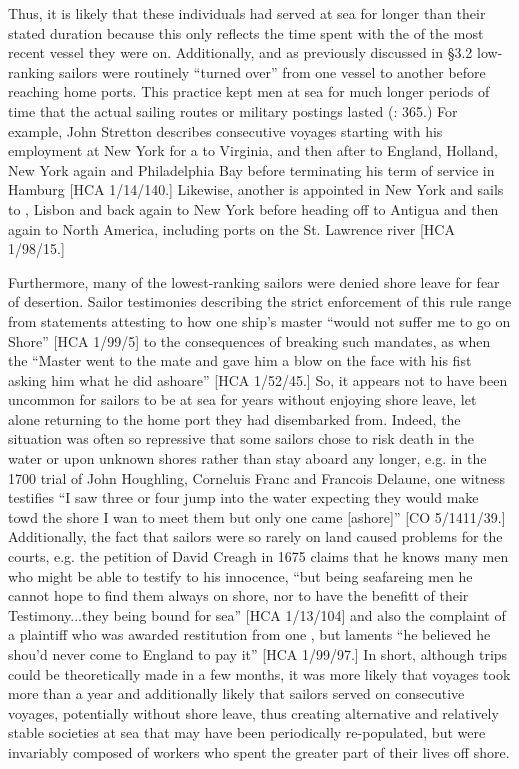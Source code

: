 Thus, it is likely that these individuals had served at sea for longer than their stated duration because this only reflects the time spent with the  of the most recent vessel they were on. Additionally, and as previously discussed in §3.2 low-ranking sailors were routinely “turned over” from one vessel to another before reaching home ports. This practice kept men at sea for much longer periods of time that the actual sailing routes or military postings lasted (\citealt{AdkinsAdkins2008}: 365.) For example, John Stretton describes consecutive voyages starting with his employment at New York for a  to Virginia, and then after to England, Holland, New York again and Philadelphia Bay before terminating his term of service in Hamburg [HCA 1/14/140.] Likewise, another  is appointed in New York and sails to , Lisbon and back again to New York before heading off to Antigua and then again to North America, including ports on the St. Lawrence river [HCA 1/98/15.] 

Furthermore, many of the lowest-ranking sailors were denied shore leave for fear of desertion. Sailor testimonies describing the strict enforcement of this rule range from statements attesting to how one ship’s master “would not suffer me to go on Shore” [HCA 1/99/5] to the consequences of breaking such mandates, as when the “Master went to the mate and gave him a blow on the face with his fist asking him what he did ashoare” [HCA 1/52/45.] So, it appears not to have been uncommon for sailors to be at sea for years without enjoying shore leave, let alone returning to the home port they had disembarked from. Indeed, the situation was often so repressive that some sailors chose to risk death in the water or upon unknown shores rather than stay aboard any longer, e.g. in the 1700 trial of John Houghling, Corneluis Franc and Francois Delaune, one witness testifies “I saw three or four jump into the water expecting they would make towd the shore I wan to meet them but only one came [ashore]” [CO 5/1411/39.] Additionally, the fact that sailors were so rarely on land caused problems for the courts, e.g. the petition of David Creagh in 1675 claims that he knows many men who might be able to testify to his innocence, “but being seafareing men he cannot hope to find them always on shore, nor to have the benefitt of their Testimony...they being bound for sea” [HCA 1/13/104] and also the complaint of a plaintiff who was awarded restitution from one , but laments “he believed he shou’d never come to England to pay it”  [HCA 1/99/97.] In short, although  trips could be theoretically made in a few months, it was more likely that voyages took more than a year and additionally likely that sailors served on consecutive voyages, potentially without shore leave, thus creating alternative and relatively stable societies at sea that may have been periodically re-populated, but were invariably composed of workers who spent the greater part of their lives off shore. 

